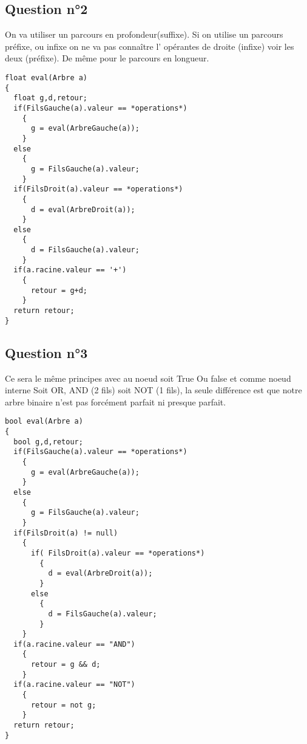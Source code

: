 \documentclass[11pt]{article}
\begin{document}
\subsection{Question n°2}
\label{sec:org33125d2}

On va utiliser un parcours en profondeur(suffixe). Si on utilise un parcours préfixe, ou infixe on ne va pas connaître l' opérantes de droite (infixe) voir les deux (préfixe). De même pour le parcours en longueur.

\begin{lstlisting}
float eval(Arbre a)
{
  float g,d,retour;
  if(FilsGauche(a).valeur == *operations*)
    {
      g = eval(ArbreGauche(a));
    }
  else
    {
      g = FilsGauche(a).valeur;
    }
  if(FilsDroit(a).valeur == *operations*)
    {
      d = eval(ArbreDroit(a));
    }
  else
    {
      d = FilsGauche(a).valeur;
    }
  if(a.racine.valeur == '+')
    {
      retour = g+d;
    }
  return retour;
} 

\end{lstlisting}

\subsection{Question n°3}
\label{sec:org4eb962f}

Ce sera le même principes avec au noeud soit True Ou false et comme noeud interne Soit OR, AND (2 fils) soit NOT (1 fils), la seule différence est que notre arbre binaire n'est pas forcément parfait ni presque parfait.

\begin{lstlisting}
bool eval(Arbre a)
{
  bool g,d,retour;
  if(FilsGauche(a).valeur == *operations*)
    {
      g = eval(ArbreGauche(a));
    }
  else
    {
      g = FilsGauche(a).valeur;
    }
  if(FilsDroit(a) != null)
    {
      if( FilsDroit(a).valeur == *operations*)
        {
          d = eval(ArbreDroit(a));
        }
      else
        {
          d = FilsGauche(a).valeur;
        }
    }
  if(a.racine.valeur == "AND")
    {
      retour = g && d;
    }
  if(a.racine.valeur == "NOT")
    {
      retour = not g;
    }
  return retour;
} 
\end{lstlisting}
\end{document}
